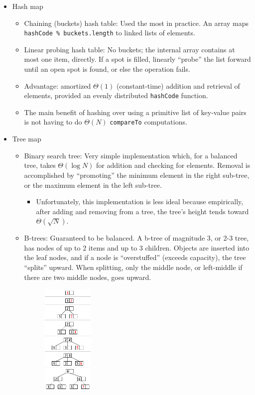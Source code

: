 \documentclass{article}
\begin{document}
\begin{itemize}
\begin{itemize}
        \item Hash map
        \begin{itemize}
            \item Chaining (buckets) hash table: Used the most in practice. An array maps \texttt{hashCode \% buckets.length} to linked lists of elements.
            \item Linear probing hash table: No buckets; the internal array contains at most one item, directly. If a spot is filled, linearly ``probe'' the list forward until an open spot is found, or else the operation fails.
            \item Advantage: amortized $\Theta(1)$ (constant-time) addition and retrieval of elements, provided an evenly distributed \texttt{hashCode} function.
            \item The main benefit of hashing over using a primitive list of key-value pairs is not having to do $\Theta(N)$ \texttt{compareTo} computations.
        \end{itemize}
        \item Tree map
        \begin{itemize}
            \item Binary search tree: Very simple implementation which, for a balanced tree, takes $\Theta(\log N)$ for addition and checking for elements. Removal is accomplished by ``promoting'' the minimum element in the right sub-tree, or the maximum element in the left sub-tree.
            \begin{itemize}
                \item Unfortunately, this implementation is less ideal because empirically, after adding and removing from a tree, the tree's height tends toward $\Theta(\sqrt{N})$.
            \end{itemize}
            \item B-trees: Guaranteed to be balanced. A b-tree of magnitude 3, or 2-3 tree, has nodes of up to 2 items and up to 3 children. Objects are inserted into the leaf nodes, and if a node is ``overstuffed'' (exceeds capacity), the tree ``splits'' upward. When splitting, only the middle node, or left-middle if there are two middle nodes, goes upward.
            \begin{figure}[h]
                \centering
                \includegraphics[width=0.25\textwidth]{images/B_tree_insertion_example.png}

\end{figure}
\end{itemize}
\end{itemize}
\end{itemize}
\end{document}
